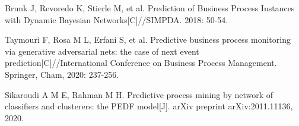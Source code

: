 \documentclass[runningheads]{llncs}
\begin{document}
\begin{thebibliography}{99}
	Brunk J, Revoredo K, Stierle M, et al. Prediction of Business Process Instances with Dynamic Bayesian Networks[C]//SIMPDA. 2018: 50-54.
	
	Taymouri F, Rosa M L, Erfani S, et al. Predictive business process monitoring via generative adversarial nets: the case of next event prediction[C]//International Conference on Business Process Management. Springer, Cham, 2020: 237-256.
	
	Sikaroudi A M E, Rahman M H. Predictive process mining by network of classifiers and clusterers: the PEDF model[J]. arXiv preprint arXiv:2011.11136, 2020.
		
	\end{thebibliography}

	
\end{document}

